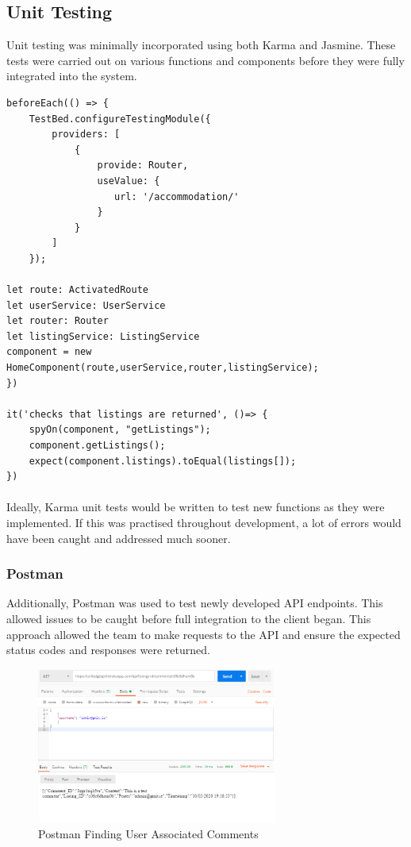 \subsection{Unit Testing}
Unit testing was minimally incorporated using both Karma and Jasmine. These tests were carried out on various functions and components before they were fully integrated into the system. \newline

\begin{lstlisting}[caption=Testing with Karma]
beforeEach(() => {
    TestBed.configureTestingModule({
        providers: [
            {
                provide: Router,
                useValue: {
                   url: '/accommodation/'
                } 
            }
        ]
    });

let route: ActivatedRoute
let userService: UserService
let router: Router
let listingService: ListingService
component = new HomeComponent(route,userService,router,listingService);
})

it('checks that listings are returned', ()=> {
    spyOn(component, "getListings");
    component.getListings();
    expect(component.listings).toEqual(listings[]);
})
\end{lstlisting}

\paragraph{}
Ideally, Karma unit tests would be written to test new functions as they were implemented. If this was practised throughout development, a lot of errors would have been caught and addressed much sooner.

\subsubsection{Postman}
Additionally, Postman was used to test newly developed API endpoints. This allowed issues to be caught before full integration to the client began. This approach allowed the team to make requests to the API and ensure the expected status codes and responses were returned.

\begin{figure}[H]
	\caption{Postman Finding User Associated Comments}
	\label{image:waterfall}
	\centering
	\includegraphics[width=0.70\textwidth]{images/postman_ex.png}
\end{figure}	

